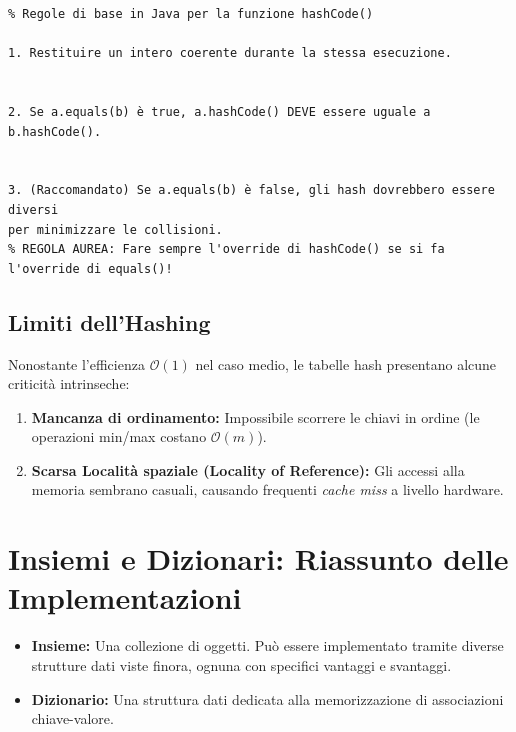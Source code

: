 \documentclass[12pt, a4paper]{article}
\begin{document}
\begin{verbatim}
% Regole di base in Java per la funzione hashCode()

1. Restituire un intero coerente durante la stessa esecuzione.


2. Se a.equals(b) è true, a.hashCode() DEVE essere uguale a b.hashCode().


3. (Raccomandato) Se a.equals(b) è false, gli hash dovrebbero essere diversi
per minimizzare le collisioni.
% REGOLA AUREA: Fare sempre l'override di hashCode() se si fa l'override di equals()!
\end{verbatim}



\subsection{Limiti dell'Hashing}
Nonostante l'efficienza $\mathcal{O}(1)$ nel caso medio, le tabelle hash presentano alcune criticità intrinseche:
\begin{enumerate}
\item \textbf{Mancanza di ordinamento:} Impossibile scorrere le chiavi in ordine (le operazioni min/max costano $\mathcal{O}(m)$).
\item \textbf{Scarsa Località spaziale (Locality of Reference):} Gli accessi alla memoria sembrano casuali, causando frequenti \textit{cache miss} a livello hardware.
\end{enumerate}




\section{Insiemi e Dizionari: Riassunto delle Implementazioni}

\begin{tcolorbox}[colback=lightergray!10, colframe=tocsec, title=\textbf{Definizioni Fondamentali}]
\begin{itemize}
\item \textbf{Insieme:} Una collezione di oggetti. Può essere implementato tramite diverse strutture dati viste finora, ognuna con specifici vantaggi e svantaggi.
\item \textbf{Dizionario:} Una struttura dati dedicata alla memorizzazione di associazioni chiave-valore.
\end{itemize}
\end{tcolorbox}
\end{document}
